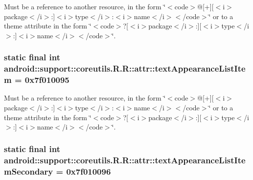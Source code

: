 Must be a reference to another resource, in the form \char`\"{}$<$code$>$@\mbox{[}+\mbox{]}\mbox{[}$<$i$>$package$<$/i$>$:\mbox{]}$<$i$>$type$<$/i$>$:$<$i$>$name$<$/i$>$$<$/code$>$\char`\"{} or to a theme attribute in the form \char`\"{}$<$code$>$?\mbox{[}$<$i$>$package$<$/i$>$:\mbox{]}\mbox{[}$<$i$>$type$<$/i$>$:\mbox{]}$<$i$>$name$<$/i$>$$<$/code$>$\char`\"{}. \hypertarget{classandroid_1_1support_1_1coreutils_1_1_r_1_1attr_ad1107b3e7e49f66905d300eafcbb47b}{
\subsubsection[{textAppearanceListItem}]{\setlength{\rightskip}{0pt plus 5cm}static final int android::support::coreutils.R.R::attr::textAppearanceListItem = 0x7f010095}}
\label{classandroid_1_1support_1_1coreutils_1_1_r_1_1attr_ad1107b3e7e49f66905d300eafcbb47b}


Must be a reference to another resource, in the form \char`\"{}$<$code$>$@\mbox{[}+\mbox{]}\mbox{[}$<$i$>$package$<$/i$>$:\mbox{]}$<$i$>$type$<$/i$>$:$<$i$>$name$<$/i$>$$<$/code$>$\char`\"{} or to a theme attribute in the form \char`\"{}$<$code$>$?\mbox{[}$<$i$>$package$<$/i$>$:\mbox{]}\mbox{[}$<$i$>$type$<$/i$>$:\mbox{]}$<$i$>$name$<$/i$>$$<$/code$>$\char`\"{}. \hypertarget{classandroid_1_1support_1_1coreutils_1_1_r_1_1attr_c2f04fb74c8792d73022935e83b62a57}{
\subsubsection[{textAppearanceListItemSecondary}]{\setlength{\rightskip}{0pt plus 5cm}static final int android::support::coreutils.R.R::attr::textAppearanceListItemSecondary = 0x7f010096}}
\label{classandroid_1_1support_1_1coreutils_1_1_r_1_1attr_c2f04fb74c8792d73022935e83b62a57}


